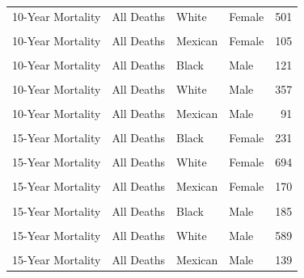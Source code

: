 \documentclass[
]{article}
\begin{document}
\begin{table}[!h]
\begin{tabular}[t]{llllr}
10-Year Mortality & All Deaths & White & Female & 501\\
\cellcolor{gray!6}{10-Year Mortality} & \cellcolor{gray!6}{CVD} & \cellcolor{gray!6}{Mexican} & \cellcolor{gray!6}{Female} & \cellcolor{gray!6}{37}\\
10-Year Mortality & All Deaths & Mexican & Female & 105\\
\cellcolor{gray!6}{10-Year Mortality} & \cellcolor{gray!6}{CVD} & \cellcolor{gray!6}{Black} & \cellcolor{gray!6}{Male} & \cellcolor{gray!6}{50}\\
10-Year Mortality & All Deaths & Black & Male & 121\\
\cellcolor{gray!6}{10-Year Mortality} & \cellcolor{gray!6}{CVD} & \cellcolor{gray!6}{White} & \cellcolor{gray!6}{Male} & \cellcolor{gray!6}{144}\\
10-Year Mortality & All Deaths & White & Male & 357\\
\cellcolor{gray!6}{10-Year Mortality} & \cellcolor{gray!6}{CVD} & \cellcolor{gray!6}{Mexican} & \cellcolor{gray!6}{Male} & \cellcolor{gray!6}{44}\\
10-Year Mortality & All Deaths & Mexican & Male & 91\\
\addlinespace
\cellcolor{gray!6}{15-Year Mortality} & \cellcolor{gray!6}{CVD} & \cellcolor{gray!6}{Black} & \cellcolor{gray!6}{Female} & \cellcolor{gray!6}{79}\\
15-Year Mortality & All Deaths & Black & Female & 231\\
\cellcolor{gray!6}{15-Year Mortality} & \cellcolor{gray!6}{CVD} & \cellcolor{gray!6}{White} & \cellcolor{gray!6}{Female} & \cellcolor{gray!6}{251}\\
15-Year Mortality & All Deaths & White & Female & 694\\
\cellcolor{gray!6}{15-Year Mortality} & \cellcolor{gray!6}{CVD} & \cellcolor{gray!6}{Mexican} & \cellcolor{gray!6}{Female} & \cellcolor{gray!6}{56}\\
15-Year Mortality & All Deaths & Mexican & Female & 170\\
\cellcolor{gray!6}{15-Year Mortality} & \cellcolor{gray!6}{CVD} & \cellcolor{gray!6}{Black} & \cellcolor{gray!6}{Male} & \cellcolor{gray!6}{76}\\
15-Year Mortality & All Deaths & Black & Male & 185\\
\cellcolor{gray!6}{15-Year Mortality} & \cellcolor{gray!6}{CVD} & \cellcolor{gray!6}{White} & \cellcolor{gray!6}{Male} & \cellcolor{gray!6}{225}\\
15-Year Mortality & All Deaths & White & Male & 589\\
\cellcolor{gray!6}{15-Year Mortality} & \cellcolor{gray!6}{CVD} & \cellcolor{gray!6}{Mexican} & \cellcolor{gray!6}{Male} & \cellcolor{gray!6}{57}\\
15-Year Mortality & All Deaths & Mexican & Male & 139\\
\bottomrule
\end{tabular}
\end{table}
\end{document}

